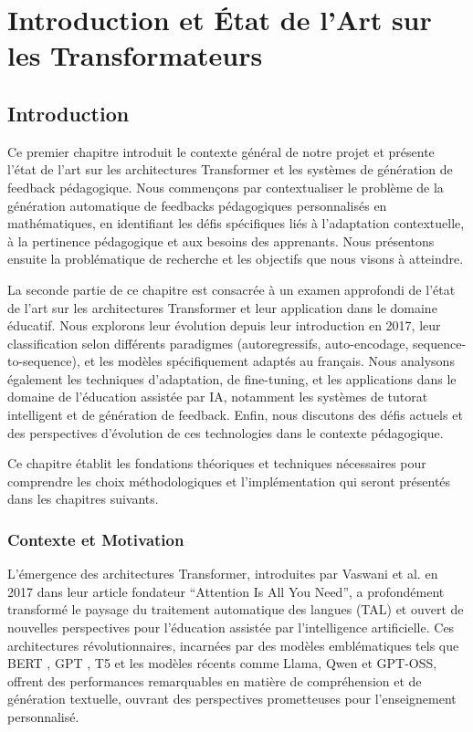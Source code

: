 
\chapter{Introduction et État de l'Art sur les Transformateurs}

\section{Introduction}

Ce premier chapitre introduit le contexte général de notre projet et présente l'état de l'art sur les architectures Transformer et les systèmes de génération de feedback pédagogique. Nous commençons par contextualiser le problème de la génération automatique de feedbacks pédagogiques personnalisés en mathématiques, en identifiant les défis spécifiques liés à l'adaptation contextuelle, à la pertinence pédagogique et aux besoins des apprenants. Nous présentons ensuite la problématique de recherche et les objectifs que nous visons à atteindre.

La seconde partie de ce chapitre est consacrée à un examen approfondi de l'état de l'art sur les architectures Transformer et leur application dans le domaine éducatif. Nous explorons leur évolution depuis leur introduction en 2017, leur classification selon différents paradigmes (autoregressifs, auto-encodage, sequence-to-sequence), et les modèles spécifiquement adaptés au français. Nous analysons également les techniques d'adaptation, de fine-tuning, et les applications dans le domaine de l'éducation assistée par IA, notamment les systèmes de tutorat intelligent et de génération de feedback. Enfin, nous discutons des défis actuels et des perspectives d'évolution de ces technologies dans le contexte pédagogique.

Ce chapitre établit les fondations théoriques et techniques nécessaires pour comprendre les choix méthodologiques et l'implémentation qui seront présentés dans les chapitres suivants.

\subsection{Contexte et Motivation}

L'émergence des architectures Transformer, introduites par Vaswani et al. en 2017 dans leur article fondateur \enquote{Attention Is All You Need}, a profondément transformé le paysage du traitement automatique des langues (TAL) et ouvert de nouvelles perspectives pour l'éducation assistée par l'intelligence artificielle. Ces architectures révolutionnaires, incarnées par des modèles emblématiques tels que BERT \cite{devlin2018bert}, GPT \cite{radford2018improving}, T5 \cite{raffel2019exploring} et les modèles récents comme Llama, Qwen et GPT-OSS, offrent des performances remarquables en matière de compréhension et de génération textuelle, ouvrant des perspectives prometteuses pour l'enseignement personnalisé.

